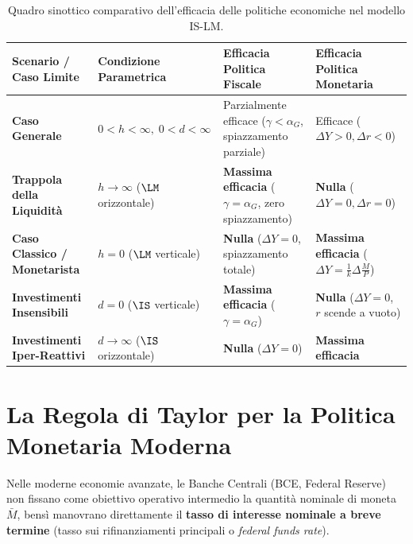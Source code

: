 \begin{table}[htbp]
\centering
\small
\renewcommand{\arraystretch}{1.4}
\begin{tabularx}{\textwidth}{l p{4.2cm} X X}
\toprule
\textbf{Scenario / Caso Limite} & \textbf{Condizione Parametrica} & \textbf{Efficacia Politica Fiscale} & \textbf{Efficacia Politica Monetaria} \\
\midrule
\textbf{Caso Generale} & $0 < h < \infty, \; 0 < d < \infty$ & Parzialmente efficace ($\gamma < \alpha_G$, spiazzamento parziale) & Efficace ($\Delta Y > 0, \Delta r < 0$) \\
\midrule
\textbf{Trappola della Liquidità} & $h \to \infty$ ($\LM$ orizzontale) & \textbf{Massima efficacia} ($\gamma = \alpha_G$, zero spiazzamento) & \textbf{Nulla} ($\Delta Y = 0, \Delta r = 0$) \\
\midrule
\textbf{Caso Classico / Monetarista} & $h = 0$ ($\LM$ verticale) & \textbf{Nulla} ($\Delta Y = 0$, spiazzamento totale) & \textbf{Massima efficacia} ($\Delta Y = \frac{1}{k}\Delta \frac{M}{P}$) \\
\midrule
\textbf{Investimenti Insensibili} & $d = 0$ ($\IS$ verticale) & \textbf{Massima efficacia} ($\gamma = \alpha_G$) & \textbf{Nulla} ($\Delta Y = 0$, $r$ scende a vuoto) \\
\midrule
\textbf{Investimenti Iper-Reattivi} & $d \to \infty$ ($\IS$ orizzontale) & \textbf{Nulla} ($\Delta Y = 0$) & \textbf{Massima efficacia} \\
\bottomrule
\end{tabularx}
\caption{Quadro sinottico comparativo dell'efficacia delle politiche economiche nel modello IS-LM.}
\label{tab:casi_limite_is_lm}
\end{table}

\section{La Regola di Taylor per la Politica Monetaria Moderna}

Nelle moderne economie avanzate, le Banche Centrali (BCE, Federal Reserve) non fissano come obiettivo operativo intermedio la quantità nominale di moneta $\bar{M}$, bensì manovrano direttamente il \textbf{tasso di interesse nominale a breve termine} (tasso sui rifinanziamenti principali o \textit{federal funds rate}).

